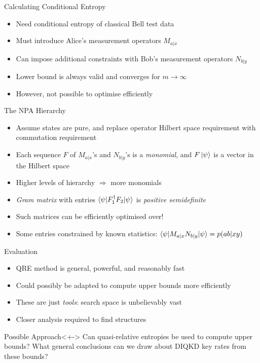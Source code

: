 \documentclass[xcolor=dvipsnames]{beamer}
\newcommand{\?}{\mathrel{?}} %
\begin{document}

\begin{frame}{Calculating Conditional Entropy}
  \begin{itemize}[<+->]
    \item Need conditional entropy of classical Bell test data
    \item Must introduce Alice's measurement operators \(M_{a|x}\)
    \item Can impose additional constraints with Bob's measurement operators \(N_{b|y}\)
    \item Lower bound is always valid and converges for \(m\to\infty\)
    \item However, not possible to optimise efficiently
  \end{itemize}
\end{frame}

\begin{frame}{The NPA Hierarchy}
  \begin{itemize}[<+->]
    \item Assume states are pure, and replace operator Hilbert space requirement with commutation requirement
    \item Each sequence \(F\) of \(M_{a|x}\)'s and \(N_{b|y}\)'s is a \emph{monomial}, and \(F\ket{\psi}\) is a vector in the Hilbert space
    \item Higher levels of hierarchy \(\Rightarrow\) more monomials
    \item \emph{Gram matrix} with entries \(\braket{\psi|F_1^{\dagger}F_2|\psi}\) is \emph{positive semidefinite}
    \item Such matrices \alert{can be efficiently optimised over!}
    \item Some entries constrained by known statistics: \(\braket{\psi|M_{a|x}N_{b|y}|\psi} = p(ab|xy)\)
  \end{itemize}
\end{frame}

\begin{frame}{Evaluation}
  \begin{itemize}[<+->]
    \item QRE method is general, powerful, and reasonably fast
    \item Could possibly be adapted to compute upper bounds more efficiently
    \item These are just \emph{tools}: search space is unbelievably vast
    \item Closer analysis required to find structures
  \end{itemize}
  \begin{block}{Possible Approach}<+->
    Can quasi-relative entropies be used to compute upper bounds? What general conclusions can we draw about DIQKD key rates from these bounds?
  \end{block}
\end{frame}
\end{document}
